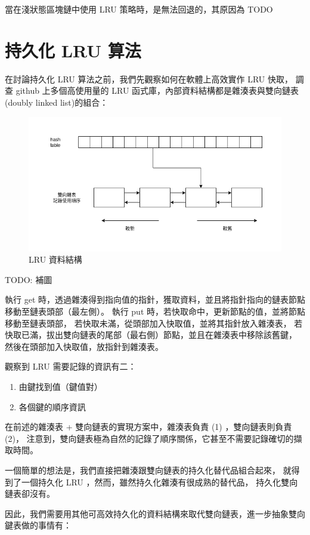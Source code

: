 當在淺狀態區塊鏈中使用 LRU 策略時，是無法回退的，其原因為 TODO

\section{持久化 LRU 算法}
在討論持久化 LRU 算法之前，我們先觀察如何在軟體上高效實作 LRU 快取，
調查 github 上多個高使用量的 LRU 函式庫，內部資料結構都是雜湊表與雙向鏈表(doubly linked list)的組合：

\begin{figure}[h]
\includegraphics[width=\textwidth]{LRU}
\caption{LRU 資料結構}
\end{figure}

TODO: 補圖

執行 get 時，透過雜湊得到指向值的指針，獲取資料，並且將指針指向的鏈表節點移動至鏈表頭部（最左側）。
執行 put 時，若快取命中，更新節點的值，並將節點移動至鏈表頭部，
若快取未滿，從頭部加入快取值，並將其指針放入雜湊表，
若快取已滿，拔出雙向鏈表的尾部（最右側）節點，並且在雜湊表中移除該舊鍵，
然後在頭部加入快取值，放指針到雜湊表。

觀察到 LRU 需要記錄的資訊有二：

\begin{enumerate}
  \item 由鍵找到值（鍵值對）
  \item 各個鍵的順序資訊
\end{enumerate}

在前述的雜湊表 + 雙向鏈表的實現方案中，雜湊表負責 (1) ，雙向鏈表則負責 (2)，
注意到，雙向鏈表極為自然的記錄了順序關係，它甚至不需要記錄確切的擷取時間。

一個簡單的想法是，我們直接把雜湊跟雙向鏈表的持久化替代品組合起來，
就得到了一個持久化 LRU ，然而，雖然持久化雜湊有很成熟的替代品，
持久化雙向鏈表卻沒有。

因此，我們需要用其他可高效持久化的資料結構來取代雙向鏈表，進一步抽象雙向鍵表做的事情有：

